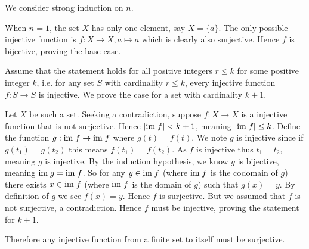 \begin{questions}
    \item We consider strong induction on $n$.

    When $n = 1$, the set $X$ has only one element, say $X = \{a\}$. The only possible injective function is $f: X \to X, a \mapsto a$ which is clearly also surjective. Hence $f$ is bijective, proving the base case.

    Assume that the statement holds for all positive integers $r \leq k$ for some positive integer $k$, i.e. for any set $S$ with cardinality $r \leq k$, every injective function $f: S \to S$ is injective. We prove the case for a set with cardinality $k + 1$.

    Let $X$ be such a set. Seeking a contradiction, suppose $f: X \to X$ is a injective function that is not surjective. Hence $|\mathrm{im}\; f| < k + 1$, meaning $|\mathrm{im}\; f| \leq k$. Define the function $g: \mathrm{im}\; f \to \mathrm{im}\; f$ where $g(t) = f(t)$. We note $g$ is injective since if $g(t_1) = g(t_2)$ this means $f(t_1) = f(t_2)$. As $f$ is injective thus $t_1 = t_2$, meaning $g$ is injective. By the induction hypothesis, we know $g$ is bijective, meaning $\mathrm{im}\; g = \mathrm{im}\; f$. So for any $y \in \mathrm{im}\; f$ (where $\mathrm{im}\; f$ is the codomain of $g$) there exists $x \in \mathrm{im}\; f$ (where $\mathrm{im}\; f$ is the domain of $g$) such that $g(x) = y$. By definition of $g$ we see $f(x) = y$. Hence $f$ is surjective. But we assumed that $f$ is not surjective, a contradiction. Hence $f$ must be injective, proving the statement for $k + 1$.

    Therefore any injective function from a finite set to itself must be surjective.
\end{questions}
